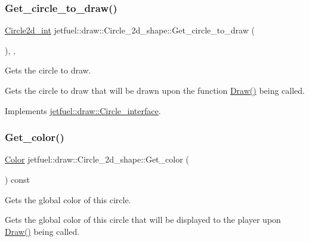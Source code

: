 \subsubsection{\texorpdfstring{Get\+\_\+circle\+\_\+to\+\_\+draw()}{Get\_circle\_to\_draw()}}
{\footnotesize\ttfamily \hyperlink{classjetfuel_1_1draw_1_1Circle2d}{Circle2d\+\_\+int} jetfuel\+::draw\+::\+Circle\+\_\+2d\+\_\+shape\+::\+Get\+\_\+circle\+\_\+to\+\_\+draw (\begin{DoxyParamCaption}{ }\end{DoxyParamCaption})\hspace{0.3cm}{\ttfamily [inline]}, {\ttfamily [override]}, {\ttfamily [virtual]}}



Gets the circle to draw. 

Gets the circle to draw that will be drawn upon the function \hyperlink{classjetfuel_1_1draw_1_1Circle__2d__shape_a8be660f3cd624dc077d9003ee3b37212}{Draw()} being called. 

Implements \hyperlink{classjetfuel_1_1draw_1_1Circle__interface_a992a93bc130288ec4c9c4d2fa4203341}{jetfuel\+::draw\+::\+Circle\+\_\+interface}.

\mbox{\label{classjetfuel_1_1draw_1_1Circle__2d__shape_ad7953fa383fdffedf6cdf9d6a3d9a1bb}} 
\subsubsection{\texorpdfstring{Get\+\_\+color()}{Get\_color()}}
{\footnotesize\ttfamily \hyperlink{classjetfuel_1_1draw_1_1Color}{Color} jetfuel\+::draw\+::\+Circle\+\_\+2d\+\_\+shape\+::\+Get\+\_\+color (\begin{DoxyParamCaption}{ }\end{DoxyParamCaption}) const\hspace{0.3cm}{\ttfamily [inline]}}



Gets the global color of this circle. 

Gets the global color of this circle that will be displayed to the player upon \hyperlink{classjetfuel_1_1draw_1_1Circle__2d__shape_a8be660f3cd624dc077d9003ee3b37212}{Draw()} being called. \mbox{\label{classjetfuel_1_1draw_1_1Circle__2d__shape_af742bd69519677da00692b9c8b7b0d74}} 
